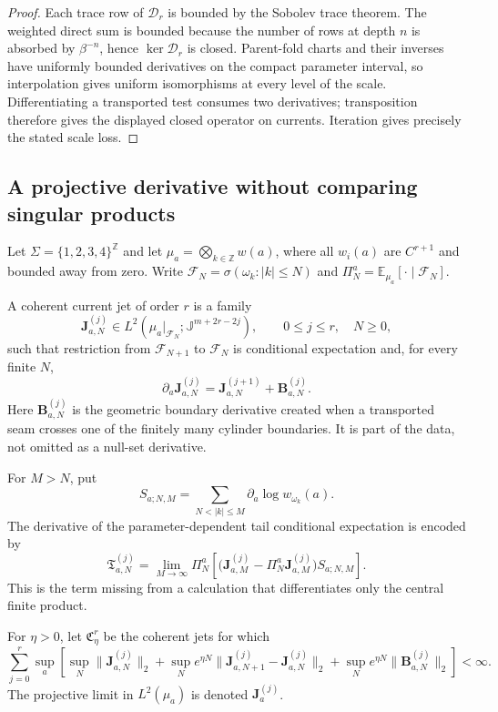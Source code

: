 \begin{proof}
Each trace row of $\mathcal D_r$ is bounded by the Sobolev trace theorem.  The
weighted direct sum is bounded because the number of rows at depth $n$ is
absorbed by $\beta^{-n}$, hence $\ker\mathcal D_r$ is closed.  Parent-fold
charts and their inverses have uniformly bounded derivatives on the compact
parameter interval, so interpolation gives uniform isomorphisms at every
level of the scale.  Differentiating a transported test consumes two
derivatives; transposition therefore gives the displayed closed operator on
currents.  Iteration gives precisely the stated scale loss.
\end{proof}

\subsection{A projective derivative without comparing singular products}

Let $\Sigma=\{1,2,3,4\}^{\mathbb Z}$ and let
$\mu_a=\bigotimes_{k\in\mathbb Z}w(a)$, where all $w_i(a)$ are $C^{r+1}$ and
bounded away from zero.  Write $\mathcal F_N=\sigma(\omega_k:|k|\le N)$ and
$\Pi_N^a=\mathbb E_{\mu_a}[\cdot\mid\mathcal F_N]$.

A coherent current jet of order $r$ is a family
\[
 \mathbf J^{(j)}_{a,N}\in
 L^2(\mu_a|_{\mathcal F_N};\mathbb J^{m+2r-2j}),
 \qquad 0\le j\le r,\quad N\ge0,
\]
such that restriction from $\mathcal F_{N+1}$ to $\mathcal F_N$ is conditional
expectation and, for every finite $N$,
\[
 \partial_a\mathbf J^{(j)}_{a,N}
 =\mathbf J^{(j+1)}_{a,N}
 +\mathbf B^{(j)}_{a,N}.                                  \tag{A1.1}
\]
Here $\mathbf B^{(j)}_{a,N}$ is the geometric boundary derivative created
when a transported seam crosses one of the finitely many cylinder
boundaries.  It is part of the data, not omitted as a null-set derivative.

For $M>N$, put
\[
 S_{a;N,M}=\sum_{N<|k|\le M}\partial_a\log w_{\omega_k}(a).
\]
The derivative of the parameter-dependent tail conditional expectation is
encoded by
\[
 \mathfrak T^{(j)}_{a,N}
 =\lim_{M\to\infty}
 \Pi_N^a\!\left[
 \bigl(\mathbf J^{(j)}_{a,M}-\Pi_N^a\mathbf J^{(j)}_{a,M}\bigr)
 S_{a;N,M}\right].                                      \tag{A1.2}
\]
This is the term missing from a calculation that differentiates only the
central finite product.

\begin{definition}
\label{def:r27-a1-domain}
For $\eta>0$, let $\mathfrak C_{\eta}^{r}$ be the coherent jets for which
\[
 \sum_{j=0}^{r}\sup_a\left[
 \sup_N\|\mathbf J^{(j)}_{a,N}\|_2+
 \sup_N e^{\eta N}
 \|\mathbf J^{(j)}_{a,N+1}-\mathbf J^{(j)}_{a,N}\|_2+
 \sup_N e^{\eta N}\|\mathbf B^{(j)}_{a,N}\|_2\right]<\infty.              \tag{A1.3}
\]
The projective limit in $L^2(\mu_a)$ is denoted $\mathbf J_a^{(j)}$.
\end{definition}


